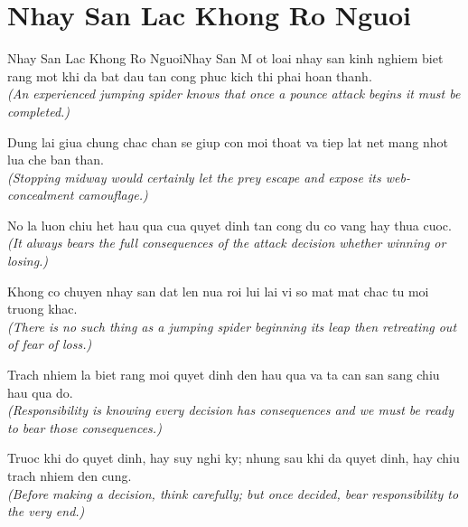 \section{Nhay San Lac Khong Ro Nguoi}
\begin{truyen}{Nhay San Lac Khong Ro Nguoi}{Nhay San}
M ot loai nhay san kinh nghiem biet rang mot khi da bat dau tan cong phuc kich thi phai hoan thanh.\\
\textit{(An experienced jumping spider knows that once a pounce attack begins it must be completed.)}

Dung lai giua chung chac chan se giup con moi thoat va tiep lat net mang nhot lua che ban than.\\
\textit{(Stopping midway would certainly let the prey escape and expose its web-concealment camouflage.)}

No la luon chiu het hau qua cua quyet dinh tan cong du co vang hay thua cuoc.\\
\textit{(It always bears the full consequences of the attack decision whether winning or losing.)}

Khong co chuyen nhay san dat len nua roi lui lai vi so mat mat chac tu moi truong khac.\\
\textit{(There is no such thing as a jumping spider beginning its leap then retreating out of fear of loss.)}

Trach nhiem la biet rang moi quyet dinh den hau qua va ta can san sang chiu hau qua do.\\
\textit{(Responsibility is knowing every decision has consequences and we must be ready to bear those consequences.)}

\end{truyen}
\begin{baihoc}
  Truoc khi do quyet dinh, hay suy nghi ky; nhung sau khi da quyet dinh, hay chiu trach nhiem den cung.\\
  \textit{(Before making a decision, think carefully; but once decided, bear responsibility to the very end.)}
\end{baihoc}

